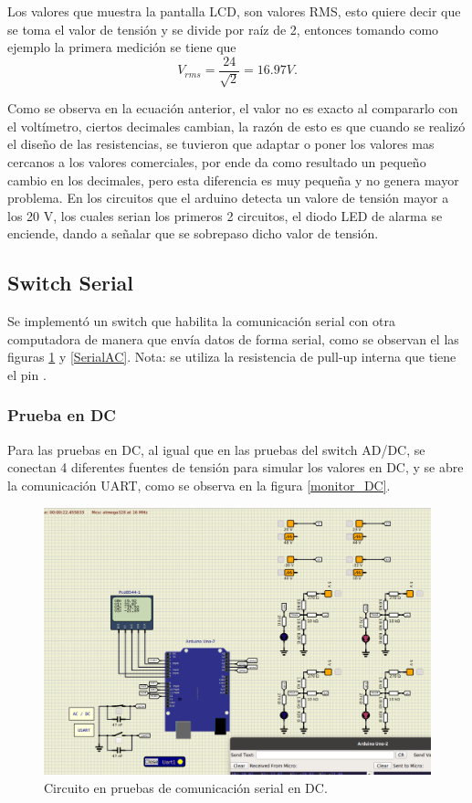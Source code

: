 Los valores que muestra la pantalla LCD, son valores RMS, esto quiere decir que se toma el valor de tensión y se divide por raíz de 2, entonces tomando como ejemplo la primera medición se tiene que
\begin{equation}
    V_{rms} = \frac{24}{\sqrt{2}} = 16.97V.
\end{equation}

Como se observa en la ecuación anterior, el valor no es exacto al compararlo con el voltímetro, ciertos decimales cambian, la razón de esto es que cuando se realizó el diseño de las resistencias, se tuvieron que adaptar o poner los valores mas cercanos a los valores comerciales, por ende da como resultado un pequeño cambio en los decimales, pero esta diferencia es muy pequeña y no genera mayor problema. En los circuitos que el arduino detecta un valore de tensión mayor a los 20 V, los cuales serian los primeros 2 circuitos, el diodo LED de alarma se enciende, dando a señalar que se sobrepaso dicho valor de tensión.

\subsection{Switch Serial}
Se implementó un switch que habilita la comunicación serial con otra computadora de manera que envía datos de forma serial, como se observan el las figuras \ref{SerialDC} y \ref{SerialAC}. Nota: se utiliza la resistencia de pull-up interna que tiene el pin \cite{pullup}.

\subsubsection{Prueba en DC}
Para las pruebas en DC, al igual que en las pruebas del switch AD/DC, se conectan 4 diferentes fuentes de tensión para simular los valores en DC, y se abre la comunicación UART, como se observa en la figura \ref{monitor_DC}.

\begin{figure}[H]
    \centering
    \includegraphics[width=\textwidth]{Imagenes/Circuit_Comu_DC.png}
    \caption{Circuito en pruebas de comunicación serial en DC.}
    \label{SerialDC}
\end{figure}

